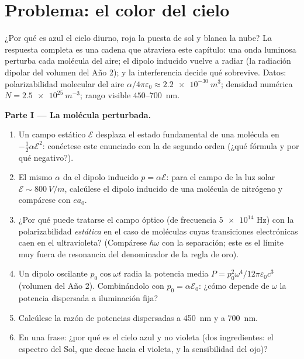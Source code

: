 \section{Problema: el color del cielo}

\begin{problem}\label{pb:b3:perturbation-theory:1}
¿Por qué es azul el cielo diurno, roja la puesta de sol y blanca la nube? La
respuesta completa es una cadena que atraviesa este capítulo: una onda
luminosa perturba cada molécula del aire; el dipolo inducido vuelve a radiar
(la radiación dipolar del volumen del Año 2); y la interferencia decide qué
sobrevive. Datos: polarizabilidad molecular del aire
$\alpha/4\pi\varepsilon_0 \approx \qty{2.2e-30}{m^3}$; densidad
numérica $N = \qty{2.5e25}{m^{-3}}$; rango visible
$450$--\qty{700}{nm}.

\medskip\noindent\textbf{Parte I --- La molécula perturbada.}
\begin{enumerate}
  \item Un campo estático $\mathcal E$ desplaza el estado fundamental de
        una molécula en $-\tfrac12\alpha\mathcal E^2$: conéctese este
        enunciado con la  de segundo orden (¿qué
        fórmula y por qué negativo?).
  \item El mismo $\alpha$ da el dipolo inducido $p =
        \alpha\mathcal E$: para el campo de la luz solar $\mathcal E \sim
        \qty{800}{V/m}$, calcúlese el dipolo inducido de una molécula de
        nitrógeno y compárese con $ea_0$.
  \item ¿Por qué puede tratarse el campo óptico (de frecuencia
        $\num{5e14}$ Hz) con la polarizabilidad \emph{estática} en el caso
        de moléculas cuyas transiciones electrónicas caen en el
        ultravioleta? (Compárese $\hbar\omega$ con la separación; este es el
        límite muy fuera de resonancia del denominador de la regla de
        oro).
  \item Un dipolo oscilante $p_0\cos\omega t$ radia la potencia media
        $P = p_0^2\omega^4/12\pi\varepsilon_0c^3$
        (volumen del Año 2). Combinándolo con $p_0 = \alpha\mathcal
        E_0$: ¿cómo depende de $\omega$ la potencia dispersada a
        iluminación fija?
  \item Calcúlese la razón de potencias dispersadas a \qty{450}{nm}
        y a \qty{700}{nm}.
  \item En una frase: ¿por qué es el cielo azul y no violeta
        (dos ingredientes: el espectro del Sol, que decae hacia el
        violeta, y la sensibilidad del ojo)?
\end{enumerate}


\end{problem}
